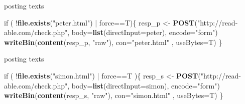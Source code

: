 \documentclass[ignorenonframetext,]{beamer}
\newenvironment{Shaded}{\begin{snugshade}}{\end{snugshade}}
\newcommand{\KeywordTok}[1]{\textcolor[rgb]{0.13,0.29,0.53}{\textbf{{#1}}}}
\newcommand{\DataTypeTok}[1]{\textcolor[rgb]{0.13,0.29,0.53}{{#1}}}
\newcommand{\StringTok}[1]{\textcolor[rgb]{0.31,0.60,0.02}{{#1}}}
\newcommand{\NormalTok}[1]{{#1}}
\begin{document}
\begin{frame}[fragile]{posting texts}

\begin{Shaded}
\begin{Highlighting}[]
\NormalTok{if ( !}\KeywordTok{file.exists}\NormalTok{(}\StringTok{"peter.html"}\NormalTok{)  |}\StringTok{ }\NormalTok{force==T)\{}
  \NormalTok{resp_p <-}\StringTok{ }\KeywordTok{POST}\NormalTok{(}\StringTok{"http://read-able.com/check.php"}\NormalTok{,}
            \DataTypeTok{body=}\KeywordTok{list}\NormalTok{(}\DataTypeTok{directInput=}\NormalTok{peter), }
            \DataTypeTok{encode=}\StringTok{"form"}\NormalTok{)}
  \KeywordTok{writeBin}\NormalTok{(}\KeywordTok{content}\NormalTok{(resp_p, }\StringTok{"raw"}\NormalTok{), }
           \DataTypeTok{con=}\StringTok{"peter.html"} \NormalTok{, }\DataTypeTok{useBytes=}\NormalTok{T)}
\NormalTok{\}}
\end{Highlighting}
\end{Shaded}

\end{frame}

\begin{frame}[fragile]{posting texts}

\begin{Shaded}
\begin{Highlighting}[]
\NormalTok{if ( !}\KeywordTok{file.exists}\NormalTok{(}\StringTok{"simon.html"}\NormalTok{) |}\StringTok{ }\NormalTok{force==T )\{}
  \NormalTok{resp_s <-}\StringTok{ }\KeywordTok{POST}\NormalTok{(}\StringTok{"http://read-able.com/check.php"}\NormalTok{,}
            \DataTypeTok{body=}\KeywordTok{list}\NormalTok{(}\DataTypeTok{directInput=}\NormalTok{simon), }
            \DataTypeTok{encode=}\StringTok{"form"}\NormalTok{)}
  \KeywordTok{writeBin}\NormalTok{(}\KeywordTok{content}\NormalTok{(resp_s, }\StringTok{"raw"}\NormalTok{), }
           \DataTypeTok{con=}\StringTok{"simon.html"} \NormalTok{, }\DataTypeTok{useBytes=}\NormalTok{T)}
\NormalTok{\}}
\end{Highlighting}
\end{Shaded}

\end{frame}
\end{document}
